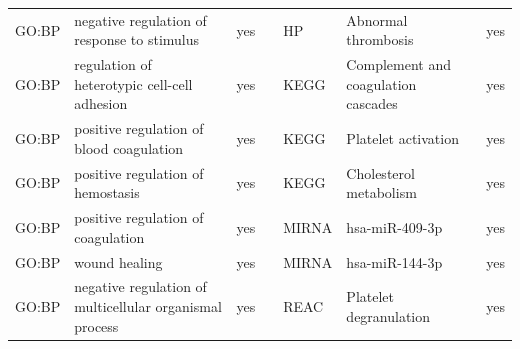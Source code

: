 \begin{longtable}{@{}lp{5cm}lllp{5cm}l@{}}
GO:BP           & negative regulation of response to stimulus                                                                                        & yes              &           & HP              & Abnormal thrombosis                                                                                                                                                    & yes              \\
GO:BP           & regulation of heterotypic cell-cell adhesion                                                                                       & yes              &           & KEGG            & Complement and coagulation cascades                                                                                                                                    & yes              \\
GO:BP           & positive regulation of blood coagulation                                                                                           & yes              &           & KEGG            & Platelet activation                                                                                                                                                    & yes              \\
GO:BP           & positive regulation of hemostasis                                                                                                  & yes              &           & KEGG            & Cholesterol metabolism                                                                                                                                                 & yes              \\
GO:BP           & positive regulation of coagulation                                                                                                 & yes              &           & MIRNA           & hsa-miR-409-3p                                                                                                                                                         & yes              \\
GO:BP           & wound healing                                                                                                                      & yes              &           & MIRNA           & hsa-miR-144-3p                                                                                                                                                         & yes              \\
GO:BP           & negative regulation of multicellular organismal process                                                                            & yes              &           & REAC            & Platelet degranulation                                                                                                                                                 & yes              \\

\end{longtable}
